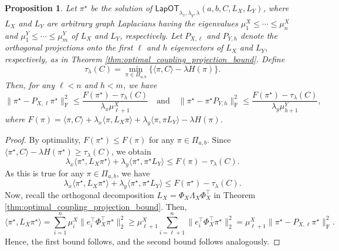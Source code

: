 \documentclass{article}
\newtheorem{proposition}{Proposition}
\theoremstyle{definition}
\begin{document}
\begin{proposition} \label{prop:proj_second_bound}
    Let $\pi^\star$ be the solution of $\mathsf{LapOT}_{\lambda_x,\lambda_y,\lambda}(a,b,C,L_X,L_Y)$, where $L_X$ and $L_Y$ are arbitrary graph Laplacians having the eigenvalues $\mu_1^X \le \cdots \le \mu_n^X$ and $\mu_1^Y \le \cdots \le \mu_m^Y$ of $L_X$ and $L_Y$, respectively. Let $P_{X, \ell}$ and $P_{Y, h}$ denote the orthogonal projections onto the first $\ell$ and $h$ eigenvectors of $L_X$ and $L_Y$, respectively, as in Theorem \ref{thm:optimal_coupling_projection_bound}. Define
    \[
        \tau_\lambda(C)
        =
        \min_{\pi\in\Pi_{a,b}}
        \{\langle \pi,C\rangle-\lambda H(\pi)\}.
    \]
    Then, for any $\ell < n$ and $h < m$, we have
    \[
        \|\pi^\star - P_{X, \ell} \pi^\star\|_{\mathrm{F}}^2
        \le
        \frac{F(\pi^\star) - \tau_\lambda(C)}{\lambda_x \mu^X_{\ell + 1}}
        \quad 
        \text{and}
        \quad
        \|\pi^\star-\pi^\star P_{Y,h}\|_{\mathrm{F}}^2
        \le
        \frac{F(\pi^\star) - \tau_\lambda(C)}{\lambda_y \mu^Y_{h + 1}},
    \]
    where $F(\pi) = \langle \pi, C \rangle + \lambda_x \langle \pi, L_X \pi \rangle + \lambda_y \langle \pi, \pi L_Y \rangle - \lambda H(\pi)$.
\end{proposition}
\begin{proof}
    By optimality, $F(\pi^\star) \le F(\pi)$ for any $\pi \in \Pi_{a, b}$. Since $\langle \pi^\star, C \rangle - \lambda H(\pi^\star)\ge \tau_\lambda(C)$, we obtain
    \[
        \lambda_x \langle \pi^\star, L_X \pi^\star \rangle
        +
        \lambda_y \langle \pi^\star, \pi^\star L_Y \rangle
        \le
        F(\pi) - \tau_\lambda(C).
    \]
    As this is true for any $\pi \in \Pi_{a, b}$, we have 
    \begin{equation*}
        \lambda_x \langle \pi^\star, L_X \pi^\star \rangle
        +
        \lambda_y \langle \pi^\star, \pi^\star L_Y \rangle
        \le
        F(\pi^\star) - \tau_\lambda(C).
    \end{equation*}
    Now, recall the orthogonal decomposition $L_X = \Phi_X \Lambda_X \Phi_X^\top$ in Theorem \ref{thm:optimal_coupling_projection_bound}. Then,
    \[
        \langle \pi^\star, L_X \pi^\star \rangle
        =
        \sum_{i = 1}^{n} \mu_i^X \|e_i^\top \Phi_X^\top \pi^\star\|_2^2
        \ge
        \mu_{\ell + 1}^X \sum_{i = \ell + 1}^{n} \|e_i^\top \Phi_X^\top \pi^\star\|_2^2
        =
        \mu_{\ell + 1}^X
        \|\pi^\star-P_{X, \ell} \pi^\star\|_{\mathrm{F}}^2.
    \]
    Hence, the first bound follows, and the second bound follows analogously.
\end{proof}
\end{document}
